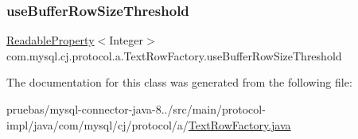 \mbox{\label{classcom_1_1mysql_1_1cj_1_1protocol_1_1a_1_1_text_row_factory_a71885b432fc6c0822fc2ba168fb4977a}} 
\subsubsection{\texorpdfstring{use\+Buffer\+Row\+Size\+Threshold}{useBufferRowSizeThreshold}}
{\footnotesize\ttfamily \mbox{\hyperlink{interfacecom_1_1mysql_1_1cj_1_1conf_1_1_readable_property}{Readable\+Property}}$<$Integer$>$ com.\+mysql.\+cj.\+protocol.\+a.\+Text\+Row\+Factory.\+use\+Buffer\+Row\+Size\+Threshold\hspace{0.3cm}{\ttfamily [protected]}}



The documentation for this class was generated from the following file\+:\begin{DoxyCompactItemize}
\item 
pruebas/mysql-\/connector-\/java-\/8../src/main/protocol-\/impl/java/com/mysql/cj/protocol/a/\mbox{\hyperlink{_text_row_factory_8java}{Text\+Row\+Factory.\+java}}\end{DoxyCompactItemize}
